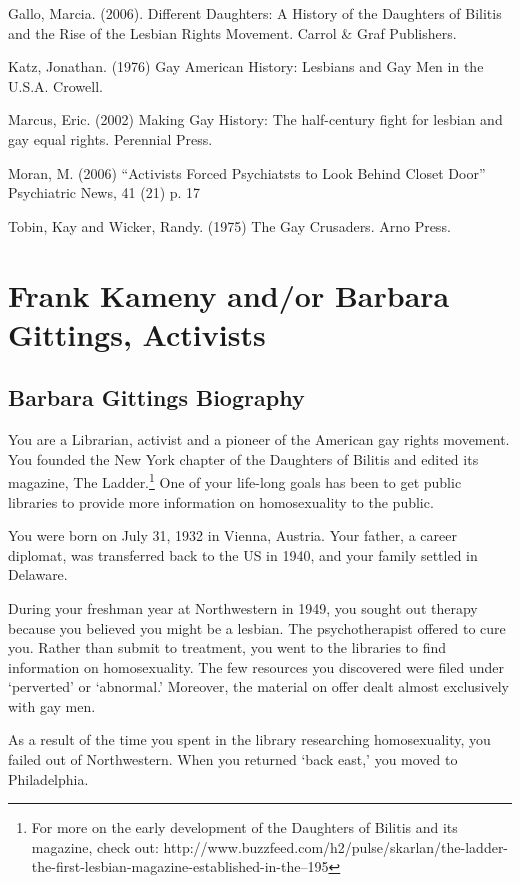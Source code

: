 \begin{refsection}
Gallo, Marcia. (2006). Different Daughters: A History of the Daughters of Bilitis and the Rise of the Lesbian Rights Movement. Carrol \& Graf Publishers.

Katz, Jonathan. (1976) Gay American History: Lesbians and Gay Men in the U.S.A. Crowell.

Marcus, Eric. (2002) Making Gay History: The half-century fight for lesbian and gay equal rights. Perennial Press.

Moran, M. (2006) ``Activists Forced Psychiatsts to Look Behind Closet Door'' Psychiatric News, 41 (21) p. 17

Tobin, Kay and Wicker, Randy. (1975) The Gay Crusaders. Arno Press.

\chapter{Frank Kameny and\slash or Barbara Gittings, Activists}
\label{frankkamenyandorbarbaragittingsactivists}

\section{Barbara Gittings Biography}
\label{barbaragittingsbiography}

You are a Librarian, activist and a pioneer of the American gay rights movement. You founded the New York chapter of the Daughters of Bilitis and edited its magazine, The Ladder.\footnote{For more on the early development of the Daughters of Bilitis and its magazine, check out: http:\slash \slash www.buzzfeed.com\slash h2\slash pulse\slash skarlan\slash the-ladder-the-first-lesbian-magazine-established-in-the--195} One of your life-long goals has been to get public libraries to provide more information on homosexuality to the public.

You were born on July 31, 1932 in Vienna, Austria. Your father, a career diplomat, was transferred back to the US in 1940, and your family settled in Delaware.

During your freshman year at Northwestern in 1949, you sought out therapy because you believed you might be a lesbian. The psychotherapist offered to cure you. Rather than submit to treatment, you went to the libraries to find information on homosexuality. The few resources you discovered were filed under `perverted' or `abnormal.' Moreover, the material on offer dealt almost exclusively with gay men.

As a result of the time you spent in the library researching homosexuality, you failed out of Northwestern. When you returned `back east,' you moved to Philadelphia.


\end{refsection}
